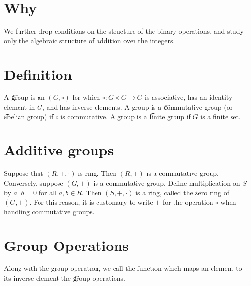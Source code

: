 
\section*{Why}

We further drop conditions on the structure of the binary operations, and study only the algebraic structure of addition over the integers.

\section*{Definition}

A \t{group} is an $(G, \circ)$ for which $\circ: G \times  G \to G$ is associative, has an identity element in $G$, and has inverse elements.
A group is a \t{commutative group} (or \t{abelian group}) if $\circ$ is commutative.
A group is a \t{finite group} if $G$ is a finite set.

\section*{Additive groups}

Suppose that $(R, +, \cdot )$ is ring.
Then $(R, +)$ is a commutative group.
Conversely, suppose $(G, +)$ is a commutative group.
Define multiplication on $S$ by $a\cdot b = 0$ for all $a, b \in R$.
Then $(S, +, \cdot )$ is a ring, called the \t{zero ring} of $(G, +)$.
For this reason, it is customary to write $+$ for the operation $\circ$ when handling commutative groups.

\section*{Group Operations}

Along with the group operation, we call the function which maps an element to its inverse element the \t{group operations}.

\blankpage